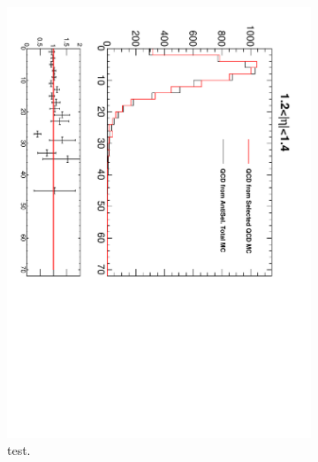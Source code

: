 \begin{figure}[htbp]
\begin{subfigure}{0.45\textwidth}
    \includegraphics*[trim = 0mm 0mm 15mm 0mm, clip, width=\textwidth, angle=90]{MetCompare_anti_eta4.pdf}
    \caption{test.}
    \label{fig:qcd_met_eta4}
  \end{subfigure}
  \begin{subfigure}{0.45\textwidth}
    \centering

\end{subfigure}
\end{figure}
